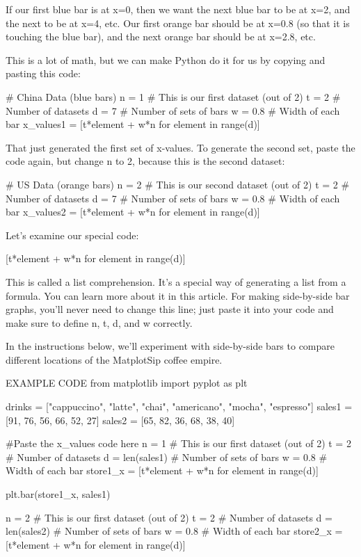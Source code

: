 \documentclass{journal}
\begin{document}
    If our first blue bar is at x=0, then we want the next blue bar to be at x=2, and the next to be at x=4, etc.
    Our first orange bar should be at x=0.8 (so that it is touching the blue bar), and the next orange bar should be at x=2.8, etc.

This is a lot of math, but we can make Python do it for us by copying and pasting this code:

# China Data (blue bars)
n = 1  # This is our first dataset (out of 2)
t = 2 # Number of datasets
d = 7 # Number of sets of bars
w = 0.8 # Width of each bar
x_values1 = [t*element + w*n for element
             in range(d)]

That just generated the first set of x-values. To generate the second set, paste the code again, but change n to 2, because this is the second dataset:

# US Data (orange bars)
n = 2  # This is our second dataset (out of 2)
t = 2 # Number of datasets
d = 7 # Number of sets of bars
w = 0.8 # Width of each bar
x_values2 = [t*element + w*n for element
             in range(d)]

Let’s examine our special code:

[t*element + w*n for element in range(d)]

This is called a list comprehension. It’s a special way of generating a list from a formula. You can learn more about it in this article. For making side-by-side bar graphs, you’ll never need to change this line; just paste it into your code and make sure to define n, t, d, and w correctly.

In the instructions below, we’ll experiment with side-by-side bars to compare different locations of the MatplotSip coffee empire.

EXAMPLE CODE
from matplotlib import pyplot as plt

drinks = ["cappuccino", "latte", "chai", "americano", "mocha", "espresso"]
sales1 =  [91, 76, 56, 66, 52, 27]
sales2 = [65, 82, 36, 68, 38, 40]

#Paste the x_values code here
n = 1  # This is our first dataset (out of 2)
t = 2 # Number of datasets
d = len(sales1) # Number of sets of bars
w = 0.8 # Width of each bar
store1_x = [t*element + w*n for element
             in range(d)]

plt.bar(store1_x, sales1)

n = 2  # This is our first dataset (out of 2)
t = 2 # Number of datasets
d = len(sales2) # Number of sets of bars
w = 0.8 # Width of each bar
store2_x = [t*element + w*n for element
             in range(d)]
\end{document}
